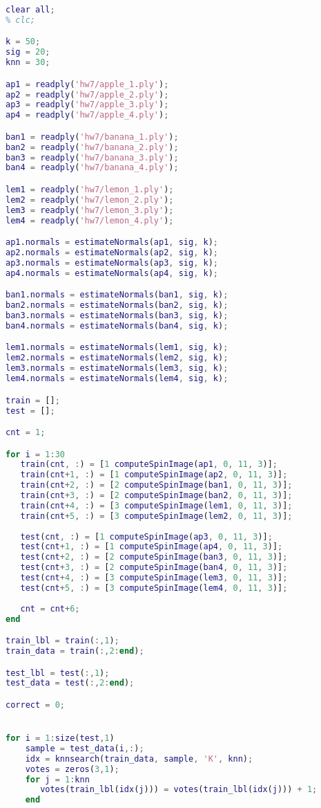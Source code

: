 \documentclass{article}
\begin{document}
\begin{lstlisting}[language=matlab]
clear all;
% clc;

k = 50;
sig = 20;
knn = 30;

ap1 = readply('hw7/apple_1.ply');
ap2 = readply('hw7/apple_2.ply');
ap3 = readply('hw7/apple_3.ply');
ap4 = readply('hw7/apple_4.ply');

ban1 = readply('hw7/banana_1.ply');
ban2 = readply('hw7/banana_2.ply');
ban3 = readply('hw7/banana_3.ply');
ban4 = readply('hw7/banana_4.ply');

lem1 = readply('hw7/lemon_1.ply');
lem2 = readply('hw7/lemon_2.ply');
lem3 = readply('hw7/lemon_3.ply');
lem4 = readply('hw7/lemon_4.ply');

ap1.normals = estimateNormals(ap1, sig, k);
ap2.normals = estimateNormals(ap2, sig, k);
ap3.normals = estimateNormals(ap3, sig, k);
ap4.normals = estimateNormals(ap4, sig, k);

ban1.normals = estimateNormals(ban1, sig, k);
ban2.normals = estimateNormals(ban2, sig, k);
ban3.normals = estimateNormals(ban3, sig, k);
ban4.normals = estimateNormals(ban4, sig, k);

lem1.normals = estimateNormals(lem1, sig, k);
lem2.normals = estimateNormals(lem2, sig, k);
lem3.normals = estimateNormals(lem3, sig, k);
lem4.normals = estimateNormals(lem4, sig, k);

train = [];
test = [];

cnt = 1;

for i = 1:30   
   train(cnt, :) = [1 computeSpinImage(ap1, 0, 11, 3)];
   train(cnt+1, :) = [1 computeSpinImage(ap2, 0, 11, 3)];
   train(cnt+2, :) = [2 computeSpinImage(ban1, 0, 11, 3)];
   train(cnt+3, :) = [2 computeSpinImage(ban2, 0, 11, 3)];
   train(cnt+4, :) = [3 computeSpinImage(lem1, 0, 11, 3)];
   train(cnt+5, :) = [3 computeSpinImage(lem2, 0, 11, 3)];
   
   test(cnt, :) = [1 computeSpinImage(ap3, 0, 11, 3)];
   test(cnt+1, :) = [1 computeSpinImage(ap4, 0, 11, 3)];
   test(cnt+2, :) = [2 computeSpinImage(ban3, 0, 11, 3)];
   test(cnt+3, :) = [2 computeSpinImage(ban4, 0, 11, 3)];
   test(cnt+4, :) = [3 computeSpinImage(lem3, 0, 11, 3)];
   test(cnt+5, :) = [3 computeSpinImage(lem4, 0, 11, 3)];
   
   cnt = cnt+6; 
end

train_lbl = train(:,1);
train_data = train(:,2:end);

test_lbl = test(:,1);
test_data = test(:,2:end);

correct = 0;


for i = 1:size(test,1)
    sample = test_data(i,:);
    idx = knnsearch(train_data, sample, 'K', knn); 
    votes = zeros(3,1);
    for j = 1:knn
       votes(train_lbl(idx(j))) = votes(train_lbl(idx(j))) + 1;
    end
    

\end{lstlisting}
\end{document}
